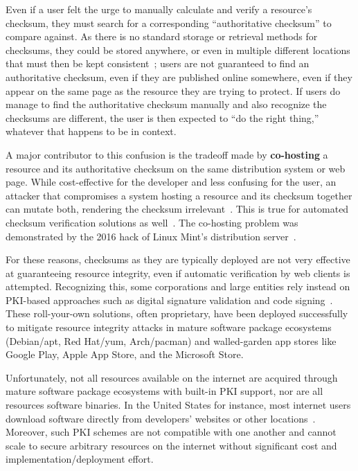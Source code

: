 Even if a user felt the urge to manually calculate and verify a resource's
checksum, they must search for a corresponding ``authoritative checksum'' to
compare against. As there is no standard storage or retrieval methods for
checksums, they could be stored anywhere, or even in multiple different
locations that must then be kept consistent~\cite{Cherubini}; users are not
guaranteed to find an authoritative checksum, even if they are published online
somewhere, even if they appear on the same page as the resource they are trying
to protect. If users do manage to find the authoritative checksum manually and
also recognize the checksums are different, the user is then expected to ``do
the right thing,'' whatever that happens to be in context.

A major contributor to this confusion is the tradeoff made by
\textbf{co-hosting} a resource and its authoritative checksum on the same
distribution system or web page. While cost-effective for the developer and less
confusing for the user, an attacker that compromises a system hosting a resource
and its checksum together can mutate both, rendering the checksum
irrelevant~\cite{Stickler}. This is true for automated checksum verification
solutions as well~\cite{Cherubini}. The co-hosting problem was demonstrated by
the 2016 hack of Linux Mint's distribution server~\cite{SCA-MINT1, SCA-MINT2}.

For these reasons, checksums as they are typically deployed are not very
effective at guaranteeing resource integrity, even if automatic verification by
web clients is attempted. Recognizing this, some corporations and large entities
rely instead on PKI-based approaches such as digital signature validation and
code signing~\cite{PKI}. These roll-your-own solutions, often proprietary, have
been deployed successfully to mitigate resource integrity attacks in mature
software package ecosystems (\eg Debian/apt, Red Hat/yum, Arch/pacman) and
walled-garden app stores like Google Play, Apple App Store, and the Microsoft
Store.

Unfortunately, not all resources available on the internet are acquired through
mature software package ecosystems with built-in PKI support, nor are all
resources software binaries. In the United States for instance, most internet
users download software directly from developers' websites or other
locations~\cite{Cherubini, File}. Moreover, such PKI schemes are not compatible
with one another and cannot scale to secure arbitrary resources on the internet
without significant cost and implementation/deployment effort.


